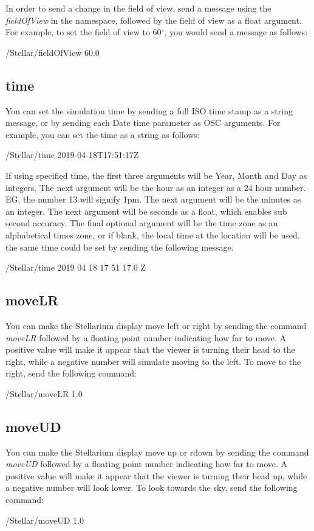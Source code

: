 In order to send a change in the field of view, send a message using the \textit{fieldOfView} in the namespace, followed by the field of view as a float argument. For example, to set the field of view to 60$^{\circ}$, you would send a message as follows:
 \begin{syntax}	
 	\medskip
	/Stellar/fieldOfView 60.0
	\medskip
 \end{syntax}
\bigskip

 \subsection{time}
You can set the simulation time by sending a full ISO time stamp as a string message, or by sending each Date time parameter as OSC arguments. For example, you can set the time as a string as follows:

\begin{syntax}	
	\medskip
	/Stellar/time 2019-04-18T17:51:17Z
	\medskip
\end{syntax}

If using specified time, the first three arguments will be  Year, Month and  Day as integers. The next  argument will be the hour as an integer as a 24 hour number. EG, the number 13 will signify 1pm. The next argument will be the minutes as an integer. The next argument will be seconds as a float, which enables sub second accuracy. The final optional argument will be the time zone as an alphabetical times zone, or if blank, the local time at the location will be used.  the same time could be set by sending the following message.
\begin{syntax}	
	\medskip
	/Stellar/time 2019 04 18 17 51 17.0 Z
	\medskip
\end{syntax}


\subsection{moveLR}
You can make the Stellarium display move left or right by sending the command \textit{moveLR} followed by a floating point number indicating how far to move. A positive value will make it appear that the viewer is turning their head to the right, while a negative number will simulate moving to the left. To move to the right, send the following command:
  \begin{syntax}	
 	\medskip
 	/Stellar/moveLR 1.0
 	\medskip
 \end{syntax}
 \bigskip

\subsection{moveUD}
You can make the Stellarium display move up or rdown by sending the command \textit{moveUD} followed by a floating point number indicating how far to move. A positive value will make it appear that the viewer is turning their head up, while a negative number will look lower. To look towards the sky, send the following command:
\begin{syntax}	
	\medskip
	/Stellar/moveUD 1.0
	\medskip
\end{syntax}
\bigskip

